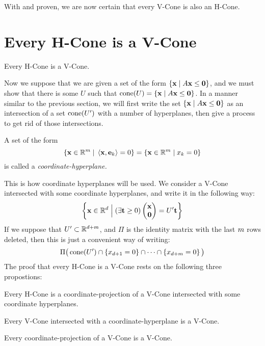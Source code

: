 With  and  proven, we are now certain that every V-Cone is also an H-Cone.

\section{Every H-Cone is a V-Cone}

\begin{Thm} \label{MWTFChtov}
  Every H-Cone is a V-Cone.
\end{Thm}

Now we suppose that we are given a set of the form $\left\{\mathbf{x}\;|\; A\mathbf{x}\leq\mathbf{0}\right\}$, and we must show that there is some $U$ such that $\operatorname{cone}(U) = \left\{\mathbf{x}\;|\; A\mathbf{x}\leq\mathbf{0}\right\}$.  In a manner similar to the previous section, we will first write the set $\left\{\mathbf{x}\;|\; A\mathbf{x}\leq\mathbf{0}\right\}$ as an intersection of a set $\operatorname{cone}(U')$ with a number of hyperplanes, then give a process to get rid of those intersections.

\begin{Def}
	A set of the form
	\[ \left\{\mathbf{x} \in \mathbb{R}^{m} \;|\; \left\langle \mathbf{x}, \mathbf{e}_k \right\rangle = 0\right\} =
		\left\{\mathbf{x} \in \mathbb{R}^{m} \;|\; x_k = 0\right\}
	\]
	is called a \em{coordinate-hyperplane}.
\end{Def}

This is how coordinate hyperplanes will be used.  We consider a V-Cone intersected with some coordinate hyperplanes, and write it in the following way:
\begin{equation}\label{eq:coneintform1}
	\set{\xv \St (\exists \t \geq 0) \xz = U'\t}
\end{equation}
If we suppose that $U' \subset \mathbb{R}^{d+m}$, and $\Pi$ is the identity matrix with the last $m$ rows deleted, then this is just a convenient way of writing:
\begin{equation}\label{eq:coneintform2}
	\Pi\big(\operatorname{cone}(U') \cap \left\{x_{d+1} = 0\right\}
	\cap \dots \cap \left\{x_{d+m} = 0\right\}\big)
\end{equation}
The proof that every H-Cone is a V-Cone rests on the following three propostions:
\begin{Lemma}\label{hconelift}
  Every H-Cone is a coordinate-projection of a V-Cone intersected with some coordinate hyperplanes.
\end{Lemma}
\begin{Lemma}\label{vconeintersect}
  Every V-Cone intersected with a coordinate-hyperplane is a V-Cone.
\end{Lemma}
\begin{Lemma}\label{vconeproject}
  Every coordinate-projection of a V-Cone is a V-Cone.
\end{Lemma}

